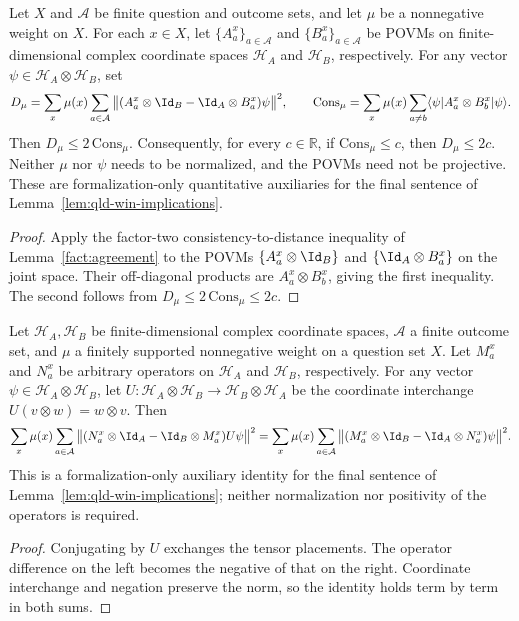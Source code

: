 \begin{lemma}
	\label{lem:qld-placed-consistency-distance}
	\leanok
	Let $X$ and $\mathcal A$ be finite question and outcome sets, and let
	$\mu$ be a nonnegative weight on $X$. For each $x\in X$, let
	$\{A_a^x\}_{a\in\mathcal A}$ and $\{B_a^x\}_{a\in\mathcal A}$ be POVMs
	on finite-dimensional complex coordinate spaces $\mathcal H_A$ and
	$\mathcal H_B$, respectively. For any vector
	$\psi\in\mathcal H_A\otimes\mathcal H_B$, set
	\[
	D_\mu=\sum_x\mu(x)\sum_{a\in\mathcal A}
	 \big\|(A_a^x\otimes\Id_B-\Id_A\otimes B_a^x)\psi\big\|^2,
	\qquad
	\mathrm{Cons}_\mu=\sum_x\mu(x)\sum_{a\ne b}
	 \langle\psi|A_a^x\otimes B_b^x|\psi\rangle.
	\]
	Then $D_\mu\leq 2\,\mathrm{Cons}_\mu$. Consequently, for every
	$c\in\mathbb R$, if $\mathrm{Cons}_\mu\leq c$, then $D_\mu\leq 2c$.
	Neither $\mu$ nor $\psi$ needs to be normalized, and the POVMs need
	not be projective. These are formalization-only quantitative auxiliaries
	for the final sentence of Lemma~\ref{lem:qld-win-implications}.
\end{lemma}
\begin{proof}
	\leanok
	Apply the factor-two consistency-to-distance inequality of
	Lemma~\ref{fact:agreement} to the POVMs
	$\{A_a^x\otimes\Id_B\}$ and $\{\Id_A\otimes B_a^x\}$ on the joint
	space. Their off-diagonal products are $A_a^x\otimes B_b^x$,
	giving the first inequality. The second follows from
	$D_\mu\leq 2\,\mathrm{Cons}_\mu\leq 2c$.
\end{proof}

\begin{lemma}
	\label{lem:qld-distance-interchange}
	\leanok
	Let $\mathcal H_A,\mathcal H_B$ be finite-dimensional complex coordinate
	spaces, $\mathcal A$ a finite outcome set, and $\mu$ a finitely supported
	nonnegative weight on a question set $X$. Let $M_a^x$ and $N_a^x$ be
	arbitrary operators on $\mathcal H_A$ and $\mathcal H_B$, respectively.
	For any vector $\psi\in\mathcal H_A\otimes\mathcal H_B$, let
	$U:\mathcal H_A\otimes\mathcal H_B\to\mathcal H_B\otimes\mathcal H_A$
	be the coordinate interchange $U(v\otimes w)=w\otimes v$. Then
	\[
	\sum_x\mu(x)\sum_{a\in\mathcal A}
	 \big\|(N_a^x\otimes\Id_A-\Id_B\otimes M_a^x)U\psi\big\|^2
	=
	\sum_x\mu(x)\sum_{a\in\mathcal A}
	 \big\|(M_a^x\otimes\Id_B-\Id_A\otimes N_a^x)\psi\big\|^2.
	\]
	This is a formalization-only auxiliary identity for the final sentence
	of Lemma~\ref{lem:qld-win-implications}; neither normalization nor
	positivity of the operators is required.
\end{lemma}
\begin{proof}
	\leanok
	Conjugating by $U$ exchanges the tensor placements. The operator
	difference on the left becomes the negative of that on the right.
	Coordinate interchange and negation preserve the norm, so the identity
	holds term by term in both sums.
\end{proof}

